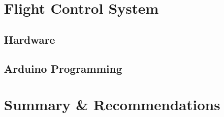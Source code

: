 \section{Flight Control System}

\subsection{Hardware}
\subsection{Arduino Programming}


\section{Summary \& Recommendations}
